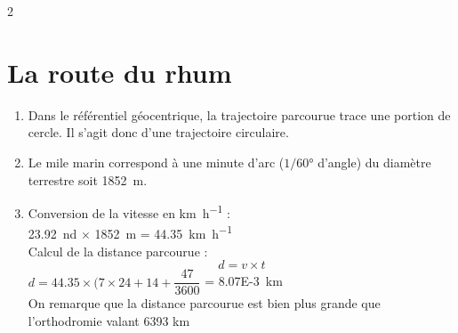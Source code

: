 \documentclass[a4paper,11pt,fleqn]{article}%
\begin{document}
\maketitle
\begin{multicols}{2}
\section{La route du rhum}

\begin{enumerate}
	\item Dans le référentiel géocentrique, la trajectoire parcourue trace une portion de cercle. Il s'agit donc d'une trajectoire circulaire.
	\item Le mile marin correspond à une minute d’arc ($1/60$\unit{\degree} d’angle) du diamètre terrestre soit \SI{1852}{m}.
	\item Conversion de la vitesse en \unit{\kilo\metre\per\hour} :\\
	\SI{23.92}{nd} $\times$ \SI{1852}{m} = \SI{44,35}{\kilo\meter\per\hour}\\
	Calcul de la distance parcourue :\\
	$$d=v \times t$$
	 $d=\num{44,35} \times (7\times 24+14+\dfrac{47}{3600}$ = \SI{8.07E-3}{km}\\
	On remarque que la distance parcourue est bien plus grande que l’orthodromie valant 6393 km
\end{enumerate}


\end{multicols}
\end{document}
